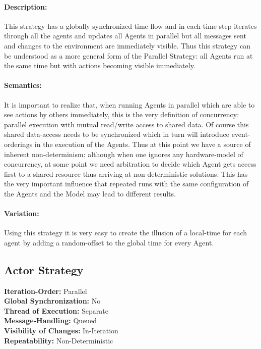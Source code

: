 \paragraph{Description:} This strategy has a globally synchronized time-flow and in each time-step iterates through all the agents and updates all Agents in parallel but all messages sent and changes to the environment are immediately visible. Thus this strategy can be understood as a more general form of the Parallel Strategy: all Agents run at the same time but with actions becoming visible immediately.

\paragraph{Semantics:} It is important to realize that, when running Agents in parallel which are able to see actions by others immediately, this is the very definition of concurrency: parallel execution with mutual read/write access to shared data. Of course this shared data-access needs to be synchronized which in turn will introduce event-orderings in the execution of the Agents. Thus at this point we have a source of inherent non-determinism: although when one ignores any hardware-model of concurrency, at some point we need arbitration to decide which Agent gets access first to a shared resource thus arriving at non-deterministic solutions. This has the very important influence that repeated runs with the same configuration of the Agents and the Model may lead to different results.

\paragraph{Variation:} Using this strategy it is very easy to create the illusion of a local-time for each agent by adding a random-offset to the global time for every Agent.



\subsection{Actor Strategy}
\textbf{Iteration-Order:} Parallel \\
\textbf{Global Synchronization:} No \\
\textbf{Thread of Execution:} Separate \\
\textbf{Message-Handling:} Queued \\
\textbf{Visibility of Changes:}	In-Iteration \\
\textbf{Repeatability:}	Non-Deterministic 

